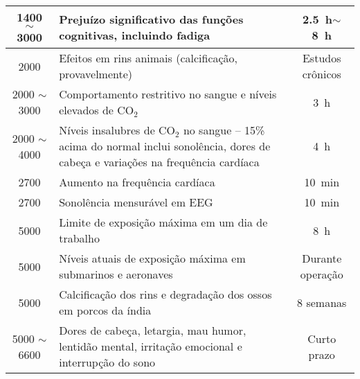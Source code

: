 \documentclass[12pt,a4paper]{article}
\begin{document}
\begin{longtable}{cp{8.5cm}c}
	\SI{1400}{\ppm}
	$\sim$
	\SI{3000}{\ppm}                                                        & {Prejuízo significativo das funções cognitivas, incluindo fadiga} & \SI{2.5}{\hour}$\sim$\SI{8}{\hour}     \\ \midrule
	\SI{2000}{\ppm}                                                        & {Efeitos em rins animais (calcificação, provavelmente)}           & Estudos crônicos                       \\ \midrule
	\SI{2000}{\ppm}
	$\sim$
	\SI{3000}{\ppm}                                                        & {Comportamento restritivo no sangue e níveis elevados de CO$_2$}  & \SI{3}{\hour}                          \\ \midrule
	\SI{2000}{\ppm}
	$\sim$
	\SI{4000}{\ppm}                                                        & {Níveis insalubres de CO$_2$ no sangue -- 15\% acima do normal
	inclui sonolência, dores de cabeça e variações na frequência cardíaca} & \SI{4}{\hour}                                                                                              \\ \midrule
	\SI{2700}{\ppm}                                                        & {Aumento na frequência cardíaca}                                  & \SI{10}{\minute}                       \\ \midrule
	\SI{2700}{\ppm}                                                        & {Sonolência mensurável em EEG}                                    & \SI{10}{\minute}                       \\ \midrule
	\SI{5000}{\ppm}                                                        & {Limite de exposição máxima em um dia de trabalho}                & \SI{8}{\hour}                          \\ \midrule
	\SI{5000}{\ppm}                                                        & {Níveis atuais de exposição máxima em submarinos e aeronaves}     & Durante operação                       \\ \midrule
	\SI{5000}{\ppm}                                                        & {Calcificação dos rins e degradação dos ossos em porcos da índia} & 8 semanas                              \\ \midrule
	\SI{5000}{\ppm}
	$\sim$
	\SI{6600}{\ppm}                                                        & {Dores de cabeça, letargia, mau humor, lentidão mental,
	irritação emocional e interrupção do sono}                             & Curto prazo                                                                                                \\ \midrule

\end{longtable}
\end{document}
